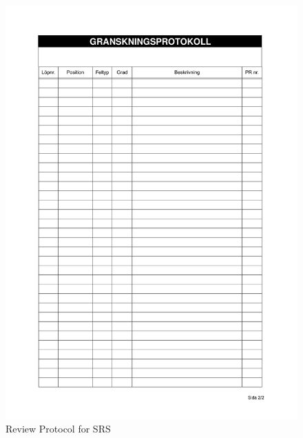 \documentclass{article}
\begin{document}
 \begin{figure}
     \centering
     \includegraphics[width=13cm]{images/SRS - Granskningsprotokoll-2}
     \renewcommand\figurename{Figure}
     \caption{Review Protocol for SRS}
     \label{fig:my_label}
 \end{figure}
 
\end{document}

